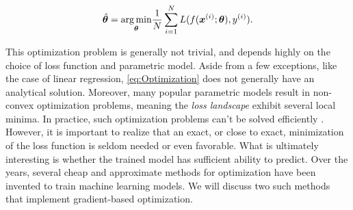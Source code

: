 \begin{equation}\label{eq:Optimization}
    \hat{\boldsymbol{\theta}} = \underset{\boldsymbol{\theta}}{\operatorname*{arg\,min}} \frac{1}{N}\sum_{i=1}^{N} L(f(\boldsymbol{x}^{(i)}; \boldsymbol{\theta}) , y^{(i)}).
\end{equation}

This optimization problem is generally not trivial, and depends highly on the choice of loss function and parametric model. Aside from a few exceptions, like the case of linear regression, \autoref{eq:Optimization} does not generally have an analytical solution. Moreover, many popular parametric models result in non-convex optimization problems, meaning the \emph{loss landscape} exhibit several local minima. In practice, such optimization problems can't be solved efficiently \cite{Vava:book}. However, it is important to realize that an exact, or close to exact, minimization of the loss function is seldom needed or even favorable. What is ultimately interesting is whether the trained model has sufficient ability to predict. Over the years, several cheap and approximate methods for optimization have been invented to train machine learning models. We will discuss two such methods that implement gradient-based optimization. 




